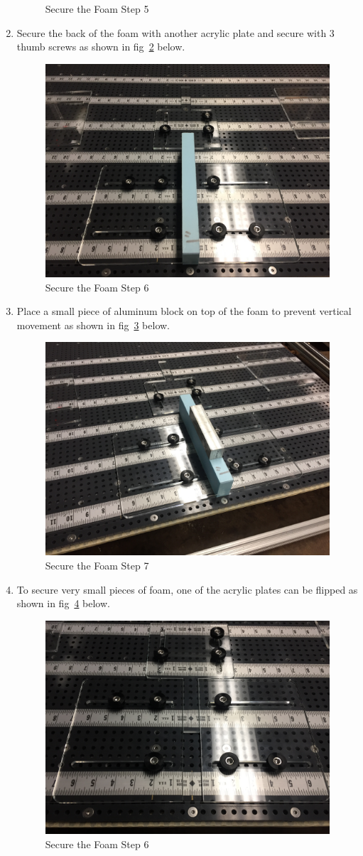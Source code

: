 \documentclass[titlepage,12pt,letter]{report}
\numberwithin{equation}{chapter}
\begin{document}
\begin{enumerate}[itemsep = 5pt,topsep=0pt]
\begin{figure} [H]
		\caption{Secure the Foam Step 5}
		\label{fig:foam2}
	\end{figure}
	\item Secure the back of the foam with another acrylic plate and secure with 3 thumb screws as shown in fig~\ref{fig:foam3} below.
	\begin{figure} [H]
		\includegraphics[width = 0.6\linewidth]{./Figures/secure_foam/3.jpg}
		\caption{Secure the Foam Step 6}
		\label{fig:foam3}
	\end{figure}
	\item Place a small piece of aluminum block on top of the foam to prevent vertical movement as shown in fig~\ref{fig:foam4} below.
	\begin{figure} [H]
		\includegraphics[width = 0.6\linewidth]{./Figures/secure_foam/4.jpg}
		\caption{Secure the Foam Step 7}
		\label{fig:foam4}
	\end{figure}
	\item To secure very small pieces of foam, one of the acrylic plates can be flipped as shown in fig~\ref{fig:foam5} below.
	\begin{figure} [H]
		\includegraphics[width = 0.6\linewidth]{./Figures/secure_foam/5.jpg}
		\caption{Secure the Foam Step 6}
		\label{fig:foam5}
	\end{figure}
\end{enumerate}
\end{document}
